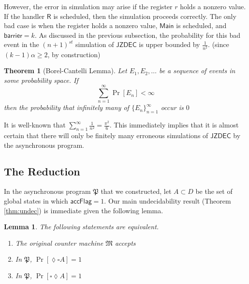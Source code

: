 \documentclass{article}
\newtheorem{theorem}[definition]{Theorem}
\newtheorem{lemma}[definition]{Lemma}
\theoremstyle{remark}
\newcommand{\program}{\mathfrak{P}}
\newcommand{\machine}{\mathfrak{M}}
\newcommand{\jzdec}{\mathsf{JZDEC}}
\newcommand{\main}{\mathsf{Main}}
\newcommand{\accflag}{\mathsf{accFlag}}
\newcommand{\barrier}{\mathsf{barrier}}
\begin{document}
However, the error in simulation may arise if the register $r$ holds a nonzero value. If the handler $\mathsf{R}$ is scheduled, then the simulation proceeds correctly. The only bad case is when the register holds a nonzero value, $\main$ is scheduled, and $\barrier = k$. As discussed in the previous subsection, the probability for this bad event in the $(n+1)^{st}$ simulation of $\jzdec$ is upper bounded by $\frac{1}{n^2}$. (since $(k-1)\alpha \ge 2$, by construction)

\begin{theorem}[Borel-Cantelli Lemma]
Let $E_1, E_2, \dots$ be a sequence of events in some probability space. If
$$
\sum_{n=1}^\infty \Pr[E_n] < \infty
$$
then the probability that infinitely many of $\{E_n\}_{n=1}^\infty$ occur is $0$
\end{theorem}

It is well-known that $\sum_{n=1}^\infty \frac{1}{n^2} = \frac{\pi^2}{6}$. This immediately implies that it is almost certain that there will only be finitely many erroneous simulations of $\jzdec$ by the asynchronous program.

\subsection{The Reduction}
In the asynchronous program $\program$ that we constructed, let $A \subset D$ be the set of global states in which $\accflag = 1$. Our main undecidability result (Theorem \ref{thm:undec}) is immediate given the following lemma.
\begin{lemma}
The following statements are equivalent.
\begin{enumerate}
\item The original counter machine $\machine$ accepts
\item In $\program$, $\Pr[\lozenge \square A] = 1$
\item In $\program$, $\Pr[\square \lozenge A] = 1$
\end{enumerate}
\end{lemma}
\end{document}
